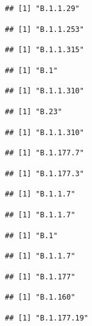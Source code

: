 \documentclass[
]{article}
\begin{document}
\begin{verbatim}
## [1] "B.1.1.29"
\end{verbatim}

\begin{verbatim}
## [1] "B.1.1.253"
\end{verbatim}

\begin{verbatim}
## [1] "B.1.1.315"
\end{verbatim}

\begin{verbatim}
## [1] "B.1"
\end{verbatim}

\begin{verbatim}
## [1] "B.1.1.310"
\end{verbatim}

\begin{verbatim}
## [1] "B.23"
\end{verbatim}

\begin{verbatim}
## [1] "B.1.1.310"
\end{verbatim}

\begin{verbatim}
## [1] "B.1.177.7"
\end{verbatim}

\begin{verbatim}
## [1] "B.1.177.3"
\end{verbatim}

\begin{verbatim}
## [1] "B.1.1.7"
\end{verbatim}

\begin{verbatim}
## [1] "B.1.1.7"
\end{verbatim}

\begin{verbatim}
## [1] "B.1"
\end{verbatim}

\begin{verbatim}
## [1] "B.1.1.7"
\end{verbatim}

\begin{verbatim}
## [1] "B.1.177"
\end{verbatim}

\begin{verbatim}
## [1] "B.1.160"
\end{verbatim}

\begin{verbatim}
## [1] "B.1.177.19"
\end{verbatim}
\end{document}
